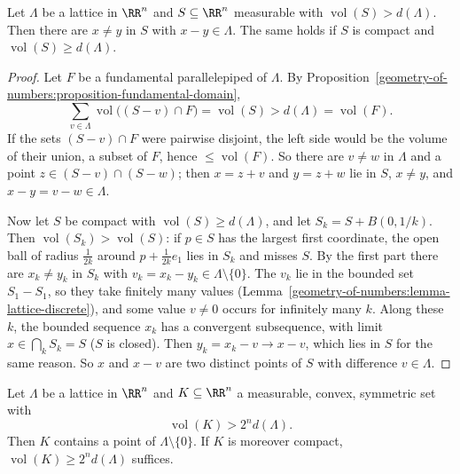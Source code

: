 \begin{lemma}[Blichfeldt]\label{geometry-of-numbers:lemma-blichfeldt}
Let $\Lambda$ be a lattice in $\RR^n$ and $S \subseteq \RR^n$ measurable with $\operatorname{vol}(S) > d(\Lambda)$. Then there are $x \neq y$ in $S$ with $x - y \in \Lambda$. The same holds if $S$ is
compact and $\operatorname{vol}(S) \geq d(\Lambda)$.
\end{lemma}

\begin{proof}
Let $F$ be a fundamental parallelepiped of $\Lambda$. By Proposition~\ref{geometry-of-numbers:proposition-fundamental-domain},
\[
\sum_{v \in \Lambda}\operatorname{vol}\bigl((S - v) \cap F\bigr) = \operatorname{vol}(S) > d(\Lambda) = \operatorname{vol}(F).
\]
If the sets $(S - v) \cap F$ were pairwise disjoint, the left side would be the volume of their union, a subset of $F$, hence $\leq \operatorname{vol}(F)$. So there are $v \neq w$ in $\Lambda$ and a point
$z \in (S - v) \cap (S - w)$; then $x = z + v$ and $y = z + w$ lie in $S$, $x \neq y$, and $x - y = v - w \in \Lambda$.

Now let $S$ be compact with $\operatorname{vol}(S) \geq d(\Lambda)$, and let $S_k = S + B(0, 1/k)$. Then $\operatorname{vol}(S_k) > \operatorname{vol}(S)$: if $p \in S$ has the largest first coordinate, the
open ball of radius $\frac1{2k}$ around $p + \frac1{2k}e_1$ lies in $S_k$ and misses $S$. By the first part there are $x_k \neq y_k$ in $S_k$ with $v_k = x_k - y_k \in \Lambda \setminus \{0\}$. The
$v_k$ lie in the bounded set $S_1 - S_1$, so they take finitely many values (Lemma~\ref{geometry-of-numbers:lemma-lattice-discrete}), and some value $v \neq 0$ occurs for infinitely many $k$. Along
these $k$, the bounded sequence $x_k$ has a convergent subsequence, with limit $x \in \bigcap_kS_k = S$ ($S$ is closed). Then $y_k = x_k - v \to x - v$, which lies in $S$ for the same reason. So $x$
and $x - v$ are two distinct points of $S$ with difference $v \in \Lambda$.
\end{proof}

\begin{theorem}\label{geometry-of-numbers:theorem-minkowski}
Let $\Lambda$ be a lattice in $\RR^n$ and $K \subseteq \RR^n$ a measurable, convex, symmetric set with
\[
\operatorname{vol}(K) > 2^nd(\Lambda).
\]
Then $K$ contains a point of $\Lambda \setminus \{0\}$. If $K$ is moreover compact, $\operatorname{vol}(K) \geq 2^nd(\Lambda)$ suffices.
\end{theorem}


